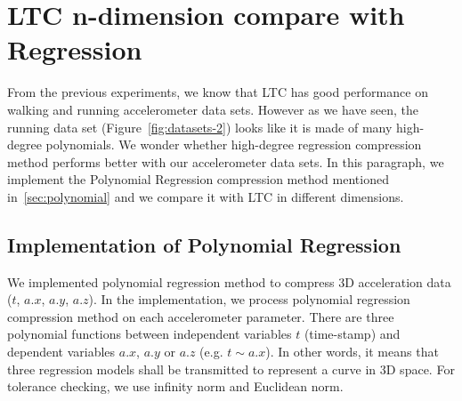 \section{LTC n-dimension compare with Regression}

From the previous experiments, we know that LTC has good performance on  walking
and running accelerometer data sets. However as we have seen, the running data
set (Figure~\ref{fig:datasets-2}) looks like it is made of many high-degree
polynomials. We wonder whether high-degree regression compression method
performs better with our accelerometer data sets. In this paragraph, we
implement the Polynomial Regression compression method mentioned
in~\ref{sec:polynomial} and we compare it with LTC in different dimensions.


\subsection{Implementation of Polynomial Regression}

We implemented polynomial regression method to compress 3D acceleration data
($t$, $a.x$, $a.y$, $a.z$). In the implementation, we process polynomial
regression compression method on each accelerometer parameter. There are three
polynomial functions between independent variables $t$ (time-stamp) and
dependent variables $a.x$, $a.y$ or $a.z$ (e.g. $t \sim a.x$). In other words,
it means that three regression models shall be transmitted to represent a curve
in 3D space. For tolerance checking, we use infinity norm and Euclidean norm.

